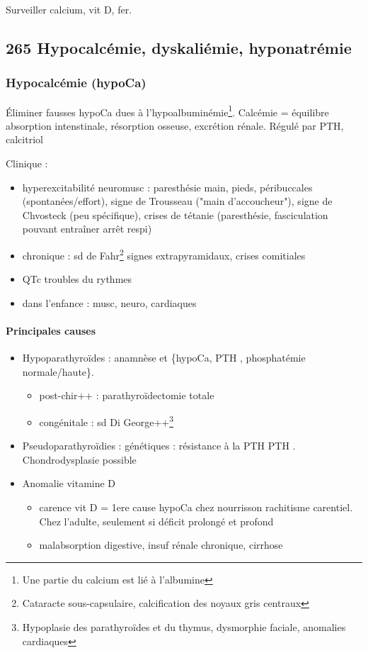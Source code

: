 \documentclass[11pt]{article}
\begin{document}
Surveiller calcium, vit D, fer.

\subsection{265 \textdagger{} Hypocalcémie, dyskaliémie, hyponatrémie}
\label{sec:org47ebbaf}

\subsubsection{Hypocalcémie (hypoCa)}
\label{sec:orgbfe1d21}
Éliminer fausses hypoCa dues à l'hypoalbuminémie\footnote{Une partie du calcium est lié à l'albumine}.
Calcémie = équilibre absorption intenstinale, résorption osseuse, excrétion
rénale. Régulé par PTH, calcitriol

Clinique : 
\begin{itemize}
\item hyperexcitabilité neuromusc : paresthésie main, pieds, péribuccales
(spontanées/effort), signe de Trousseau ("main d'accoucheur"), signe de
Chvosteck (peu spécifique), crises de tétanie (paresthésie, fasciculation
pouvant entraîner arrêt respi)
\item chronique : sd de Fahr\footnote{Cataracte sous-capsulaire, calcification des noyaux gris centraux} \thus signes extrapyramidaux, crises comitiales
\item \inc QTc \thus troubles du rythmes
\item dans l'enfance : musc, neuro, cardiaques
\end{itemize}

\paragraph{Principales causes}
\label{sec:orgf110e8d}
\begin{itemize}
\item Hypoparathyroïdes : anamnèse et \{hypoCa, PTH \dec, phosphatémie
normale/haute\}.
\begin{itemize}
\item post-chir++ : parathyroïdectomie totale
\item congénitale : sd Di George++\footnote{Hypoplasie des parathyroïdes et du thymus, dysmorphie faciale, anomalies cardiaques}
\end{itemize}
\item Pseudoparathyroïdies : génétiques : résistance à la PTH \thus PTH
\inc. Chondrodysplasie possible
\item Anomalie vitamine D
\begin{itemize}
\item carence vit D = 1ere cause hypoCa chez nourrisson \thus rachitisme
carentiel. Chez l'adulte, seulement si déficit prolongé et profond
\item malabsorption digestive, insuf rénale chronique, cirrhose
\end{itemize}
\end{itemize}
\end{document}
